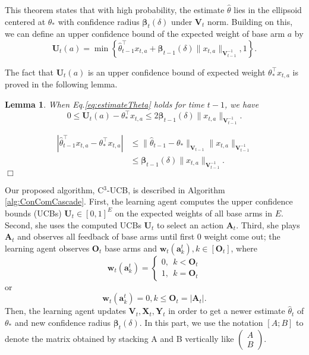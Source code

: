 \documentclass{article}
\newcommand{\bbeta}{\boldsymbol{\beta}}
\newcommand{\bA}{\mathbf{A}}
\newcommand{\ba}{\mathbf{a}}
\newcommand{\bO}{\mathbf{O}}
\newcommand{\bU}{\mathbf{U}}
\newcommand{\bV}{\mathbf{V}}
\newcommand{\bw}{\mathbf{w}}
\newcommand{\bX}{\mathbf{X}}
\newcommand{\bY}{\mathbf{Y}}
\newcommand{\abs}[1]{\left| #1 \right|}
\newcommand{\norm}[1]{\| #1 \|}
\newtheorem{lemma}[theorem]{Lemma}%
\newenvironment{proof}{\noindent {\textbf{Proof. }}}{$\Box$ \medskip}
\begin{document}
This theorem states that with high probability, the estimate $\hat{\theta}$ lies in the ellipsoid centered at $\theta_*$  with confidence radius $\bbeta_t(\delta)$ under $\bV_t$ norm. Building on this, we can define an upper confidence bound of the expected weight of base arm $a$ by
\begin{equation}
\label{eq:defU}
\bU_t(a) = \min\left\{\hat{\theta}_{t-1}^{\top}x_{t,a} + \bbeta_{t-1}(\delta)\norm{x_{t,a}}_{\bV_{t-1}^{-1}}, 1 \right\}.
\end{equation}

The fact that $\bU_t(a)$ is an upper confidence bound of expected weight $\theta_*^{\top}x_{t,a}$ is proved in the following lemma.
\begin{lemma}
\label{lem:estimateU}
When Eq.\eqref{eq:estimateTheta} holds for time $t-1$, we have
$$
0 \leq \bU_t(a) - \theta_{\ast}^{\top}x_{t,a} \leq 2\bbeta_{t-1}(\delta)\norm{x_{t,a}}_{\bV_{t-1}^{-1}}.
$$
\end{lemma}
\begin{proof}
\begin{align*}
\abs{\hat{\theta}_{t-1}^{\top}x_{t,a} - \theta_{\ast}^{\top}x_{t,a}} &\leq \norm{\hat{\theta}_{t-1} - \theta_{\ast}}_{\bV_{t-1}} \norm{x_{t,a}}_{\bV_{t-1}^{-1}} \\
&\leq \bbeta_{t-1}(\delta)\norm{x_{t,a}}_{\bV_{t-1}^{-1}}.
\end{align*}
\end{proof}

Our proposed algorithm, C$^3$-UCB, is described in Algorithm \ref{alg:ConComCascade}. 
First, the learning agent 
	computes the upper confidence bounds (UCBs) $\bU_t \in [0,1]^{E}$ on the expected weights of all base arms in $E$. 
Second, she uses the computed UCBs $\bU_t$ to select an action $\bA_t$. 
Third, she plays $\bA_t$ and observes all feedback of base arms until first $0$ weight come out; the learning agent observes $\bO_t$ base arms and $\bw_t(\ba_k^t), k \in [\bO_t]$, where 
$$
\bw_t(\ba_{k}^t) = \begin{cases} 0, ~~k < \bO_t\\ 1, ~~k = \bO_t\end{cases}
$$ 
or
$$
\bw_t(\ba_k^t) = 0, k \leq \bO_t = \abs{\bA_t}.
$$
Then, the learning agent updates $\bV_t, \bX_t, \bY_t$ in order to get a newer estimate $\hat{\theta}_t$ of $\theta_*$ and new confidence radius $\bbeta_t(\delta)$. In this part, we use the notation $[A; B]$ to denote the matrix obtained by stacking A and B vertically like
 $\begin{pmatrix} A\\ B\end{pmatrix}$.
\end{document}
